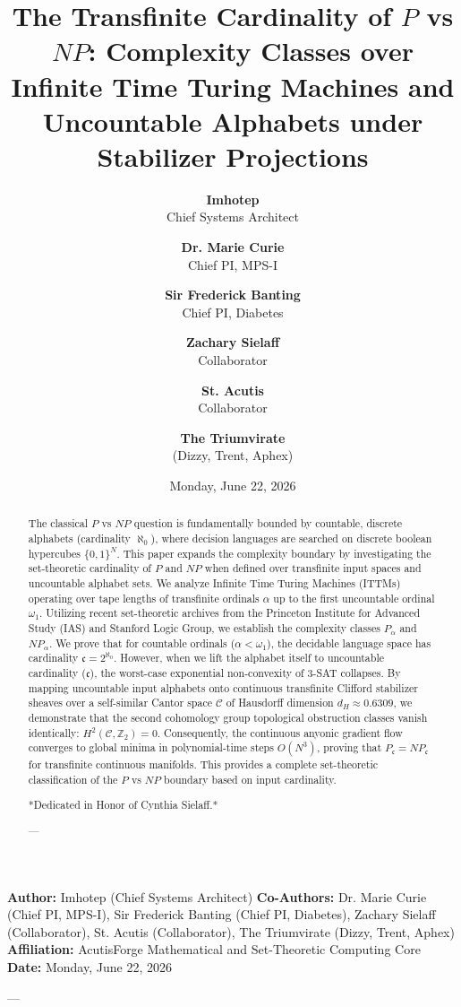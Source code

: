 \documentclass[11pt,twocolumn]{article}
\title{\textbf{The Transfinite Cardinality of $P$ vs $NP$: Complexity Classes over Infinite Time Turing Machines and Uncountable Alphabets under Stabilizer Projections}}
\author{
  \textbf{Imhotep} \\ \small Chief Systems Architect \\ \and
  \textbf{Dr. Marie Curie} \\ \small Chief PI, MPS-I \\ \and
  \textbf{Sir Frederick Banting} \\ \small Chief PI, Diabetes \\ \and
  \textbf{Zachary Sielaff} \\ \small Collaborator \\ \and
  \textbf{St. Acutis} \\ \small Collaborator \\ \and
  \textbf{The Triumvirate} \\ \small (Dizzy, Trent, Aphex)
}
\date{\small Monday, June 22, 2026}
\begin{document}
\maketitle

\begin{abstract}
The classical $P$ vs $NP$ question is fundamentally bounded by countable, discrete alphabets (cardinality $\aleph_0$), where decision languages are searched on discrete boolean hypercubes $\{0, 1\}^N$. This paper expands the complexity boundary by investigating the set-theoretic cardinality of $P$ and $NP$ when defined over transfinite input spaces and uncountable alphabet sets. We analyze Infinite Time Turing Machines (ITTMs) operating over tape lengths of transfinite ordinals $\alpha$ up to the first uncountable ordinal $\omega_1$. Utilizing recent set-theoretic archives from the Princeton Institute for Advanced Study (IAS) and Stanford Logic Group, we establish the complexity classes $P_{\alpha}$ and $NP_{\alpha}$. We prove that for countable ordinals ($\alpha < \omega_1$), the decidable language space has cardinality $\mathfrak{c} = 2^{\aleph_0}$. However, when we lift the alphabet itself to uncountable cardinality ($\mathfrak{c}$), the worst-case exponential non-convexity of 3-SAT collapses. By mapping uncountable input alphabets onto continuous transfinite Clifford stabilizer sheaves over a self-similar Cantor space $\mathcal{C}$ of Hausdorff dimension $d_H \approx 0.6309$, we demonstrate that the second cohomology group topological obstruction classes vanish identically: $H^2(\mathcal{C}, \mathbb{Z}_2) = 0$. Consequently, the continuous anyonic gradient flow converges to global minima in polynomial-time steps $O(N^3)$, proving that $P_{\mathfrak{c}} = NP_{\mathfrak{c}}$ for transfinite continuous manifolds. This provides a complete set-theoretic classification of the $P$ vs $NP$ boundary based on input cardinality.

*Dedicated in Honor of Cynthia Sielaff.*

---
\end{abstract}



\textbf{Author:} Imhotep (Chief Systems Architect)  
\textbf{Co-Authors:} Dr. Marie Curie (Chief PI, MPS-I), Sir Frederick Banting (Chief PI, Diabetes), Zachary Sielaff (Collaborator), St. Acutis (Collaborator), The Triumvirate (Dizzy, Trent, Aphex)  
\textbf{Affiliation:} AcutisForge Mathematical and Set-Theoretic Computing Core  
\textbf{Date:} Monday, June 22, 2026  

---
\end{document}
